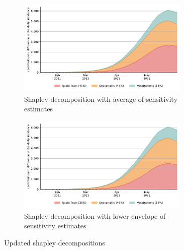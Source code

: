 \begin{figure}
    \centering

    \begin{subfigure}[b]{0.475\textwidth}
        \centering
        \includegraphics[width=0.9\textwidth]{figures/results/figures/data/testing/full_decomposition_channels_area_average}
        \caption{Shapley decomposition with average of sensitivity estimates}
    \end{subfigure}
    \begin{subfigure}[b]{0.475\textwidth}
        \centering
        \includegraphics[width=0.9\textwidth]{figures/results/figures/data/testing/full_decomposition_channels_area_lower_envelope}
        \caption{Shapley decomposition with lower envelope of sensitivity estimates}
    \end{subfigure}

    \caption{Updated shapley decompositions}
    \label{fig:robustness_to_sensitivity_assumptions}
\end{figure}

\FloatBarrier

%


